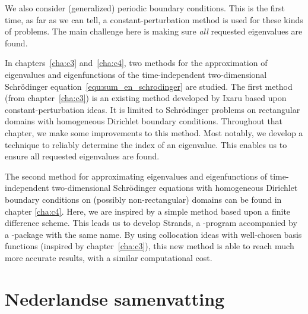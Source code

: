 We also consider (generalized) periodic boundary conditions. This is the first time, as far as we can tell, a constant-perturbation method is used for these kinds of problems. The main challenge here is making sure \emph{all} requested eigenvalues are found.

In chapters~\ref{cha:c3} and~\ref{cha:c4}, two methods for the approximation of eigenvalues and eigenfunctions of the time-independent two-dimensional Schrödinger equation~\eqref{equ:sum_en_schrodinger}  are studied. The first method (from chapter~\ref{cha:c3}) is an existing method developed by Ixaru based upon constant-perturbation ideas. It is limited to Schrödinger problems on rectangular domains with homogeneous Dirichlet boundary conditions. Throughout that chapter, we make some improvements to this method. Most notably, we develop a technique to reliably determine the index of an eigenvalue. This enables us to ensure all requested eigenvalues are found.

The second method for approximating eigenvalues and eigenfunctions of time-independent two-dimensional Schrödinger equations with homogeneous Dirichlet boundary conditions on (possibly non-rectangular) domains can be found in chapter \ref{cha:c4}. Here, we are inspired by a simple method based upon a finite difference scheme. This leads us to develop Strands, a \cpp{}-program accompanied by a \lpython{}-package with the same name. By using collocation ideas with well-chosen basis functions (inspired by chapter~\ref{cha:c3}), this new method is able to reach much more accurate results, with a similar computational cost.

\section*{Nederlandse samenvatting}


\stopchapter
